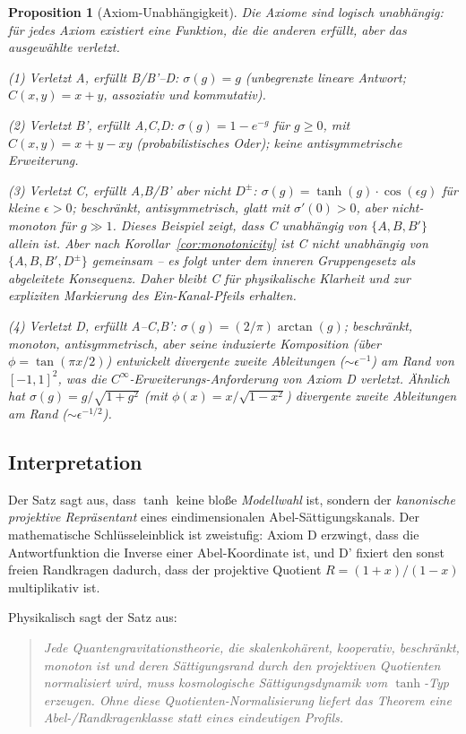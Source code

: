 \documentclass[aps,prd,twocolumn,superscriptaddress,nofootinbib]{revtex4-2}
\newtheorem{proposition}{Proposition}
\begin{document}
\begin{proposition}[Axiom-Unabhängigkeit]
\label{prop:independence}
Die Axiome sind logisch unabhängig: für jedes Axiom existiert eine Funktion, die die anderen erfüllt, aber das ausgewählte verletzt.

\textit{(1) Verletzt A, erfüllt B/B'--D:} $\sigma(g) = g$ (unbegrenzte lineare Antwort; $C(x,y) = x+y$, assoziativ und kommutativ).

\textit{(2) Verletzt B', erfüllt A,C,D:} $\sigma(g) = 1 - e^{-g}$ für $g \geq 0$, mit $C(x,y) = x + y - xy$ (probabilistisches Oder); keine antisymmetrische Erweiterung.

\textit{(3) Verletzt C, erfüllt A,B/B' aber nicht $D^\pm$:} $\sigma(g) = \tanh(g) \cdot \cos(\epsilon g)$ für kleine $\epsilon > 0$; beschränkt, antisymmetrisch, glatt mit $\sigma'(0) > 0$, aber nicht-monoton für $g \gg 1$. Dieses Beispiel zeigt, dass C unabhängig von $\{A, B, B'\}$ allein ist. Aber nach Korollar~\ref{cor:monotonicity} ist C \textit{nicht} unabhängig von $\{A, B, B', D^\pm\}$ gemeinsam -- es folgt unter dem inneren Gruppengesetz als abgeleitete Konsequenz. Daher bleibt C für physikalische Klarheit und zur expliziten Markierung des Ein-Kanal-Pfeils erhalten.

\textit{(4) Verletzt D, erfüllt A--C,B':} $\sigma(g) = (2/\pi)\arctan(g)$; beschränkt, monoton, antisymmetrisch, aber seine induzierte Komposition (über $\phi = \tan(\pi x/2)$) entwickelt divergente zweite Ableitungen ($\sim \epsilon^{-1}$) am Rand von $[-1,1]^2$, was die $C^\infty$-Erweiterungs-Anforderung von Axiom D verletzt. Ähnlich hat $\sigma(g) = g/\sqrt{1+g^2}$ (mit $\phi(x) = x/\sqrt{1-x^2}$) divergente zweite Ableitungen am Rand ($\sim \epsilon^{-1/2}$).
\end{proposition}

\subsection{Interpretation}

Der Satz sagt aus, dass $\tanh$ keine bloße \textit{Modellwahl} ist, sondern der \textit{kanonische projektive Repräsentant} eines eindimensionalen Abel-Sättigungskanals. Der mathematische Schlüsseleinblick ist zweistufig: Axiom D erzwingt, dass die Antwortfunktion die Inverse einer Abel-Koordinate ist, und D' fixiert den sonst freien Randkragen dadurch, dass der projektive Quotient $R=(1+x)/(1-x)$ multiplikativ ist.

Physikalisch sagt der Satz aus:
\begin{quote}
\textit{Jede Quantengravitationstheorie, die skalenkohärent, kooperativ, beschränkt, monoton ist und deren Sättigungsrand durch den projektiven Quotienten normalisiert wird, muss kosmologische Sättigungsdynamik vom $\tanh$-Typ erzeugen. Ohne diese Quotienten-Normalisierung liefert das Theorem eine Abel-/Randkragenklasse statt eines eindeutigen Profils.}
\end{quote}
\end{document}

